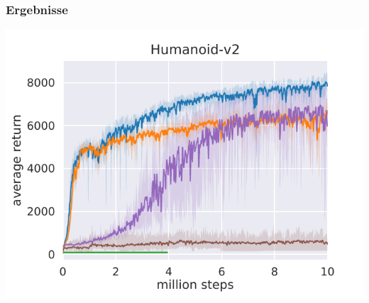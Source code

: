 \begin{frame}
    \frametitle{Ergebnisse}
    \includegraphics[scale=0.8]{figures/humanoid-gym-backup-2.pdf}
\end{frame}


